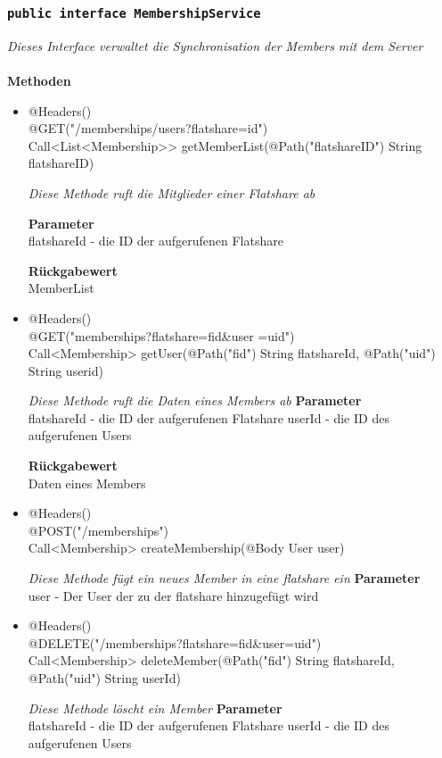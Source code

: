 	\subsubsection{\texttt{public interface  MembershipService }}
\textit{Dieses Interface verwaltet die Synchronisation der Members mit dem Server}\\
\\
	\textbf{Methoden} \\
		\begin{itemize}
		\item{@Headers()\\ @GET("/memberships/users?flatshare={id}") \\ Call<List<Membership>> getMemberList(@Path("flatshareID") String flatshareID)}

		\textit{Diese Methode ruft die Mitglieder einer Flatshare ab}

		\textbf{Parameter} \\
	flatshareId - die ID der aufgerufenen Flatshare  

		\textbf{Rückgabewert} \\
	MemberList

      \item{@Headers()\\ @GET("memberships?flatshare={fid}\&user ={uid}")\\Call<Membership> getUser(@Path("fid") String flatshareId, @Path("uid") String userid)}

		\textit{Diese Methode ruft die Daten eines Members ab}        	
		\textbf{Parameter} \\
		flatshareId - die ID der aufgerufenen Flatshare 
	userId - die ID des aufgerufenen Users

		\textbf{Rückgabewert} \\
      Daten eines Members


      \item{@Headers()\\ @POST("/memberships")\\ Call<Membership> createMembership(@Body User user)}

		\textit{Diese Methode fügt ein neues Member in eine flatshare ein}        	
		\textbf{Parameter} \\
		user - Der User der zu der flatshare hinzugefügt wird 

	      \item{@Headers()\\ @DELETE("/memberships?flatshare={fid}\&user={uid}")\\Call<Membership> deleteMember(@Path("fid") String flatshareId, @Path("uid") String userId)}

		\textit{Diese Methode löscht ein Member}        	
		\textbf{Parameter} \\
		flatshareId - die ID der aufgerufenen Flatshare 
	userId - die ID des aufgerufenen Users


	 \end{itemize}

